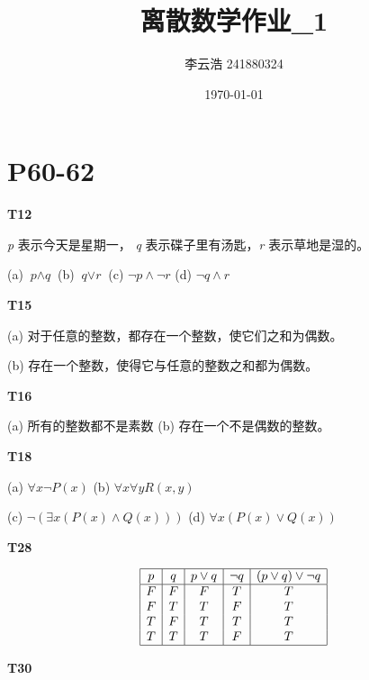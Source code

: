 \documentclass{article}
\title{离散数学作业\_1}
\author{李云浩 241880324}
\date{\today}
\begin{document}
\maketitle
\section{\textbf{P60-62}}
\textbf{T12}

\textit{p} 表示今天是星期一， \textit{q} 表示碟子里有汤匙，\textit{r} 表示草地是湿的。

(a) $\textit{p} \land \textit{q}$ \quad (b) $\textit{q} \lor \textit{r}$ \quad (c) $\lnot \textit{p} \land \lnot \textit{r}$ \quad (d) $\lnot \textit{q} \land \textit{r}$ 

\vspace{10pt}

\textbf{T15}

(a) 对于任意的整数，都存在一个整数，使它们之和为偶数。

(b) 存在一个整数，使得它与任意的整数之和都为偶数。

\vspace{10pt}

\textbf{T16}

(a) 所有的整数都不是素数 \quad (b) 存在一个不是偶数的整数。

\vspace{10pt}

\textbf{T18}

(a) $\forall x \lnot P(x)$ \quad (b) $\forall x \forall y R(x, y)$

(c) $\lnot(\exists x (P(x) \land Q(x)))$ \quad (d) $\forall x (P(x) \lor Q(x))$

\vspace{10pt}

\textbf{T28}

\[
\begin{array}{|c|c|c|c|c|}
    \hline
    p & q & p \lor q & \lnot q & (p \lor q) \lor \lnot q\\
    \hline
    F & F & F & T & T\\
    F & T & T & F & T\\
    T & F & T & T & T\\
    T & T & T & F & T\\
    \hline
\end{array}
\]

\vspace{10pt}

\textbf{T30}
\end{document}
